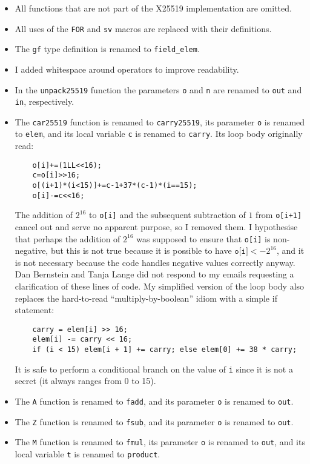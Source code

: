 \documentclass[manuscript]{acmart}
\begin{document}
\begin{itemize}
    \item All functions that are not part of the X25519 implementation are omitted.
    \item All uses of the \verb|FOR| and \verb|sv| macros are replaced with their definitions.
    \item The \verb|gf| type definition is renamed to \verb|field_elem|.
    \item I added whitespace around operators to improve readability.
    \item In the \verb|unpack25519| function the parameters \verb|o| and \verb|n| are renamed to \verb|out| and \verb|in|, respectively.
    \item The \verb|car25519| function is renamed to \verb|carry25519|, its parameter \verb|o| is renamed to \verb|elem|, and its local variable \verb|c| is renamed to \verb|carry|.
        Its loop body originally read:
\begin{verbatim}
    o[i]+=(1LL<<16);
    c=o[i]>>16;
    o[(i+1)*(i<15)]+=c-1+37*(c-1)*(i==15);
    o[i]-=c<<16;
\end{verbatim}
        The addition of $2^{16}$ to \verb|o[i]| and the subsequent subtraction of $1$ from \verb|o[i+1]| cancel out and serve no apparent purpose, so I removed them.
        I hypothesise that perhaps the addition of $2^{16}$ was supposed to ensure that \verb|o[i]| is non-negative, but this is not true because it is possible to have $\texttt{o[i]} < -2^{16}$, and it is not necessary because the code handles negative values correctly anyway.
        Dan Bernstein and Tanja Lange did not respond to my emails requesting a clarification of these lines of code.
        My simplified version of the loop body also replaces the hard-to-read ``multiply-by-boolean'' idiom with a simple if statement:
\begin{verbatim}
    carry = elem[i] >> 16;
    elem[i] -= carry << 16;
    if (i < 15) elem[i + 1] += carry; else elem[0] += 38 * carry;
\end{verbatim}
        It is safe to perform a conditional branch on the value of \verb|i| since it is not a secret (it always ranges from 0 to 15).
    \item The \verb|A| function is renamed to \verb|fadd|, and its parameter \verb|o| is renamed to \verb|out|.
    \item The \verb|Z| function is renamed to \verb|fsub|, and its parameter \verb|o| is renamed to \verb|out|.
    \item The \verb|M| function is renamed to \verb|fmul|, its parameter \verb|o| is renamed to \verb|out|, and its local variable \verb|t| is renamed to \verb|product|.

\end{itemize}
\end{document}
